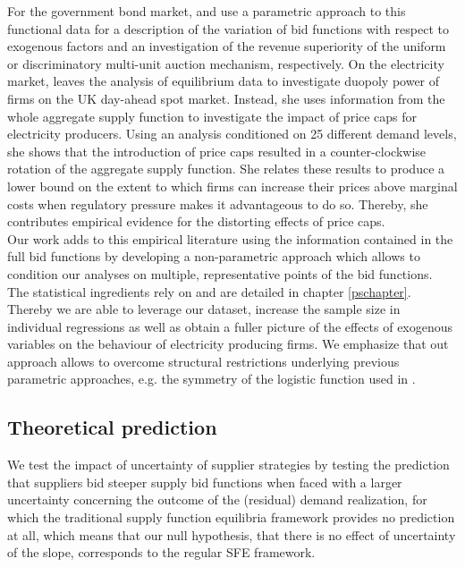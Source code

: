 For the government bond market, \cite{preget2005treasury} and \cite{ozcan2004logistic} use a parametric approach to this functional data for a description of the variation of bid functions with respect to exogenous factors and an investigation of the revenue superiority of the uniform or discriminatory multi-unit auction mechanism, respectively. On the electricity market,  \cite{wolfram1999measuring} leaves the analysis of equilibrium data to investigate duopoly power of firms on the UK day-ahead spot market. Instead, she uses information from the whole aggregate supply function to investigate the impact of price caps for electricity producers. Using an analysis conditioned on 25 different demand levels, she shows that the introduction of price caps resulted in a counter-clockwise rotation of the aggregate supply function. She relates these results to produce a lower bound on the extent to which firms can increase their prices above marginal costs when regulatory pressure makes it advantageous to do so. Thereby, she contributes empirical evidence for the distorting effects of price caps. \\

Our work adds to this empirical literature using the information contained in the full bid functions by developing a non-parametric approach which allows to condition our analyses on multiple, representative points of the bid functions. The statistical ingredients rely on \cite{ramsaysilverman2005functional} and are detailed in chapter \ref{pschapter}. Thereby we are able to leverage our dataset, increase the sample size in individual regressions as well as obtain a fuller picture of the effects of exogenous variables on the behaviour of electricity producing firms. We emphasize that out approach allows to overcome structural restrictions underlying previous parametric approaches, e.g. the symmetry of the logistic function used in \cite{pw2002etude}.

\subsection{Theoretical prediction}
\label{intropredict}

We test the impact of uncertainty of supplier strategies by testing the prediction that suppliers bid steeper supply bid functions when faced with a larger uncertainty concerning the outcome of the (residual) demand realization, for which the traditional supply function equilibria framework provides no prediction at all, which means that our null hypothesis, that there is no effect of uncertainty of the slope, corresponds to the regular SFE framework.\\

